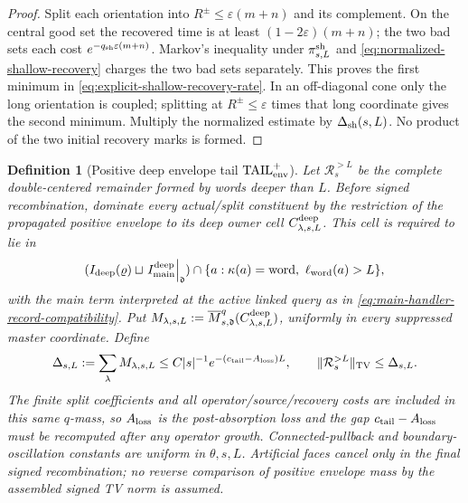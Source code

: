 \documentclass[11pt]{article}
\newtheorem{definition}[theorem]{Definition}
\begin{document}
\begin{proof}
Split each orientation into $R^\pm\le\varepsilon(m+n)$ and its complement.
On the central good set the recovered time is at least
$(1-2\varepsilon)(m+n)$; the two bad sets each cost
$e^{-q_{\rm sh}\varepsilon(m+n)}$.  Markov's inequality under
$\pi^{\rm sh}_{s,L}$ and
\eqref{eq:normalized-shallow-recovery} charges the two bad sets separately.
This proves the first minimum in
\eqref{eq:explicit-shallow-recovery-rate}.  In an off-diagonal cone only the
long orientation is coupled; splitting at $R^\pm\le\varepsilon$ times that
long coordinate gives the second minimum.  Multiply the normalized estimate
by $\Delta_{\rm sh}(s,L)$.  No product of the two initial recovery marks is
formed.
\end{proof}

\begin{definition}[Positive deep envelope tail
$\mathrm{TAIL}_{\rm env}^{+}$]
\label{def:deep-envelope-tail}
Let $\mathcal R_s^{>L}$ be the complete double-centered remainder formed by
words deeper than $L$.  Before signed recombination, dominate every
actual/split constituent by the restriction of the propagated positive
envelope to its deep owner cell $C_{\lambda,s,L}^{\rm deep}$.  This cell is
required to lie in
\begin{equation}
\label{eq:deep-owner-record-compatibility}
 (I_{\rm deep}(\varrho)\sqcup
   \left.I_{\rm main}^{\rm deep}\right|_{\mathfrak d})
 \cap\{a:\kappa(a)={\rm word},\ \ell_{\rm word}(a)>L\},
\end{equation}
with the main term interpreted at the active linked query as in
\eqref{eq:main-handler-record-compatibility}.  Put
$M_{\lambda,s,L}:=
\overline M_{s,\mathfrak d}^{q}(C_{\lambda,s,L}^{\rm deep})$, uniformly in
every suppressed master coordinate.  Define
\begin{equation}
\label{eq:deep-positive-envelope-mass}
 \Delta_{s,L}:=\sum_\lambda M_{\lambda,s,L}
 \le C|s|^{-1}e^{-(c_{\rm tail}-A_{\rm loss})L},
 \qquad
 \|\mathcal R_s^{>L}\|_{\rm TV}\le\Delta_{s,L}.
\end{equation}
The finite split coefficients and all operator/source/recovery costs are
included in this same $q$-mass, so $A_{\rm loss}$ is the post-absorption
loss and the gap $c_{\rm tail}-A_{\rm loss}$ must be recomputed after any
operator growth.  Connected-pullback
and boundary-oscillation constants are uniform in $\theta,s,L$.
Artificial faces cancel only in the final signed recombination; no reverse
comparison of positive envelope mass by the assembled signed TV norm is
assumed.
\end{definition}
\end{document}
